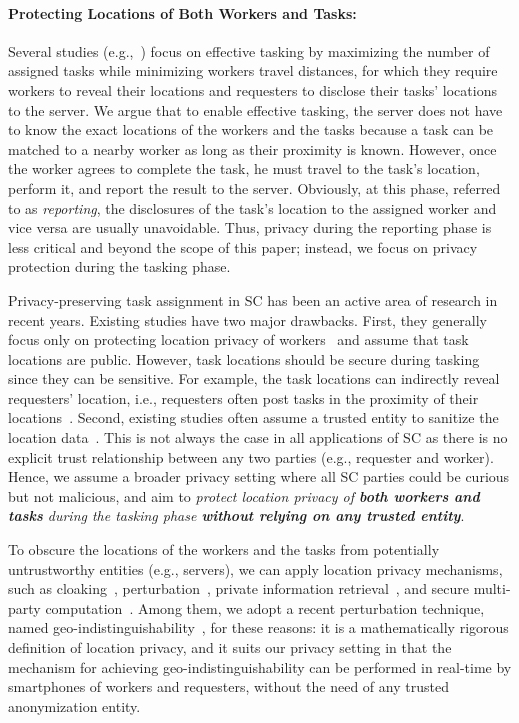 \documentclass{USC-Thesis}
\numberwithin{equation}{chapter}
\begin{document}
\paragraph{Protecting Locations of Both Workers and Tasks:} Several studies (e.g.,~\cite{kazemi2012geocrowd,tran2017real}) focus on effective tasking by maximizing the number of assigned tasks while minimizing workers travel distances, for which they require workers to reveal their locations and requesters to disclose their tasks' locations to the server. We argue that to enable effective tasking, the server does not have to know the exact locations of the workers and the tasks because a task can be matched to a nearby worker as long as their proximity is known. However, once the worker agrees to complete the task, he must travel to the task's location, perform it, and report the result to the server. Obviously, at this phase, referred to as \emph{reporting}, the disclosures of the task's location to the assigned worker and vice versa are usually unavoidable. Thus, privacy during the reporting phase is less critical and beyond the scope of this paper; instead, we focus on privacy protection during the tasking phase.



Privacy-preserving task assignment in SC has been an active area of research in recent years. Existing studies have two major drawbacks. First, they generally focus only on protecting location privacy of workers~\cite{to2014framework,Gong2015,Shen2016} and assume that task locations are public. However, task locations should be secure during tasking since they can be sensitive.
For example, the task locations can indirectly reveal requesters' location, i.e., requesters often post tasks in the proximity of their locations~\cite{to2017location}.
Second, existing studies often assume a trusted entity to sanitize the location data~\cite{kazemi2011privacy,pournajaf2014spatial,to2014framework}. This is not always the case in all applications of SC as there is no explicit trust relationship between any two parties (e.g., requester and worker).
Hence, we assume a broader privacy setting where all SC parties could be curious but not malicious, and aim to \emph{protect location privacy of \textbf{both workers and tasks} during the tasking phase \textbf{without relying on any trusted entity}}.

To obscure the locations of the workers and the tasks from potentially untrustworthy entities (e.g., servers), we can apply location privacy mechanisms, such as cloaking~\cite{gruteser2003anonymous}, perturbation~\cite{andres2013geo,xiao2015protecting}, private information retrieval~\cite{ghinita2008private}, and secure multi-party computation~\cite{goryczka2015comprehensive}. Among them, we adopt a recent perturbation technique, named geo-indistinguishability~\cite{andres2013geo}, for these reasons: it is a mathematically rigorous definition of location privacy, and it suits our privacy setting in that the mechanism for achieving geo-indistinguishability can be performed in real-time by smartphones of workers and requesters, without the need of any trusted anonymization entity.
\end{document}
